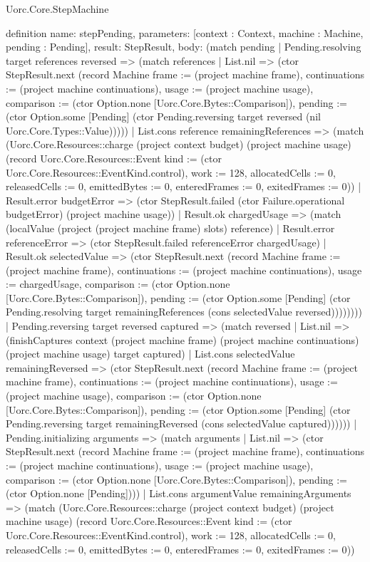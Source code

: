 \begin{lexlean}{Uorc.Core.StepMachine}
\begin{semanticmodule}
definition{
  name: stepPending,
  parameters: [context : Context, machine : Machine, pending : Pending],
  result: StepResult,
  body: (match pending
    | Pending.resolving target references reversed => (match references
      | List.nil => (ctor StepResult.next (record Machine {frame := (project machine frame), continuations := (project machine continuations), usage := (project machine usage), comparison := (ctor Option.none [Uorc.Core.Bytes::Comparison]), pending := (ctor Option.some [Pending] (ctor Pending.reversing target reversed (nil Uorc.Core.Types::Value)))}))
      | List.cons reference remainingReferences => (match (Uorc.Core.Resources::charge (project context budget) (project machine usage) (record Uorc.Core.Resources::Event {kind := (ctor Uorc.Core.Resources::EventKind.control), work := 128, allocatedCells := 0, releasedCells := 0, emittedBytes := 0, enteredFrames := 0, exitedFrames := 0}))
        | Result.error budgetError => (ctor StepResult.failed (ctor Failure.operational budgetError) (project machine usage))
        | Result.ok chargedUsage => (match (localValue (project (project machine frame) slots) reference)
          | Result.error referenceError => (ctor StepResult.failed referenceError chargedUsage)
          | Result.ok selectedValue => (ctor StepResult.next (record Machine {frame := (project machine frame), continuations := (project machine continuations), usage := chargedUsage, comparison := (ctor Option.none [Uorc.Core.Bytes::Comparison]), pending := (ctor Option.some [Pending] (ctor Pending.resolving target remainingReferences (cons selectedValue reversed)))})))))
    | Pending.reversing target reversed captured => (match reversed
      | List.nil => (finishCaptures context (project machine frame) (project machine continuations) (project machine usage) target captured)
      | List.cons selectedValue remainingReversed => (ctor StepResult.next (record Machine {frame := (project machine frame), continuations := (project machine continuations), usage := (project machine usage), comparison := (ctor Option.none [Uorc.Core.Bytes::Comparison]), pending := (ctor Option.some [Pending] (ctor Pending.reversing target remainingReversed (cons selectedValue captured)))})))
    | Pending.initializing arguments => (match arguments
      | List.nil => (ctor StepResult.next (record Machine {frame := (project machine frame), continuations := (project machine continuations), usage := (project machine usage), comparison := (ctor Option.none [Uorc.Core.Bytes::Comparison]), pending := (ctor Option.none [Pending])}))
      | List.cons argumentValue remainingArguments => (match (Uorc.Core.Resources::charge (project context budget) (project machine usage) (record Uorc.Core.Resources::Event {kind := (ctor Uorc.Core.Resources::EventKind.control), work := 128, allocatedCells := 0, releasedCells := 0, emittedBytes := 0, enteredFrames := 0, exitedFrames := 0}))
}
\end{semanticmodule}
\end{lexlean}
